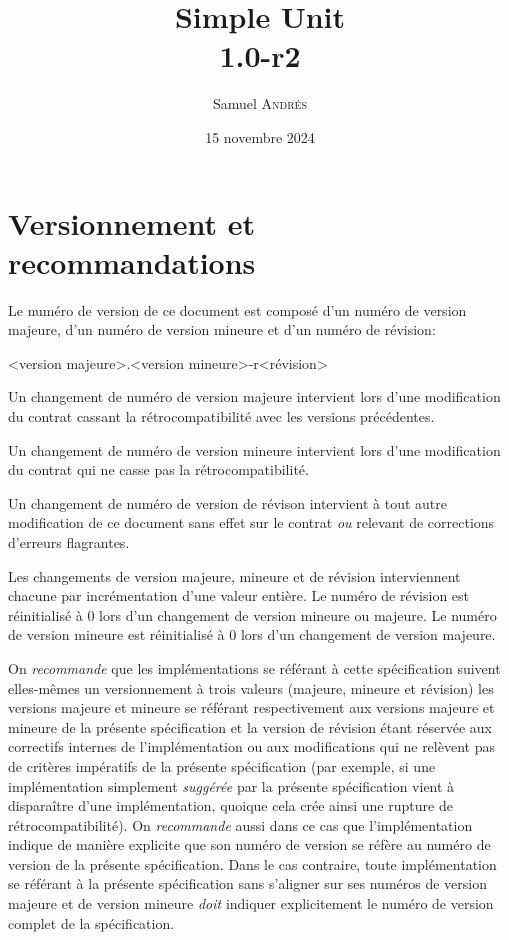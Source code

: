 \documentclass[a4paper,twoside,10pt]{article}
\title{Simple Unit\\1.0-r2}
\author{Samuel \textsc{Andrés}}
\date{15 novembre 2024}
\begin{document}
\maketitle

\section{Versionnement et recommandations}

Le numéro de version de ce document est composé d'un numéro de version majeure, d'un numéro de version mineure et d'un
numéro de révision:

<version majeure>.<version mineure>-r<révision>

Un changement de numéro de version majeure intervient lors d'une modification du contrat cassant la rétrocompatibilité
avec les versions précédentes.

Un changement de numéro de version mineure intervient lors d'une modification du contrat qui ne casse pas la
rétrocompatibilité.

Un changement de numéro de version de révison intervient à tout autre modification de ce document sans effet sur le
contrat \emph{ou} relevant de corrections d'erreurs flagrantes.

Les changements de version majeure, mineure et de révision interviennent chacune par incrémentation d'une valeur
entière. Le numéro de révision est réinitialisé à 0 lors d'un changement de version mineure ou majeure. Le numéro de
version mineure est réinitialisé à 0 lors d'un changement de version majeure.

On \emph{recommande} que les implémentations se référant à cette spécification suivent elles-mêmes un versionnement à
trois valeurs (majeure, mineure et révision) les versions majeure et mineure se référant respectivement aux versions
majeure et mineure de la présente spécification et la version de révision étant réservée aux correctifs internes de
l'implémentation ou aux modifications qui ne relèvent pas de critères impératifs de la présente spécification (par
exemple, si une implémentation simplement \emph{suggérée} par la présente spécification vient à disparaître d'une
implémentation, quoique cela crée ainsi une rupture de rétrocompatibilité). On \emph{recommande} aussi dans ce cas que
l'implémentation indique de manière explicite que son numéro de version se réfère au numéro de version de la présente
spécification. Dans le cas contraire, toute implémentation se référant à la présente spécification sans s'aligner sur
ses numéros de version majeure et de version mineure \emph{doit} indiquer explicitement le numéro de version complet de
la spécification.
\end{document}
